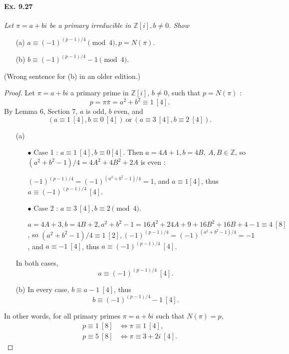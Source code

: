 \documentclass[11pt,a4paper]{article}
\newcommand{\Z}{\mathbb{Z}}
\begin{document}
\paragraph{Ex. 9.27}

{\it Let $\pi = a+bi$ be a primary irreducible in $\Z[i], b\ne 0$. Show
\begin{enumerate}
\item[(a)] $a \equiv (-1)^{(p-1)/4} \pmod 4, p = N(\pi)$.
\item[(b)] $b \equiv (-1)^{(p-1)/4} - 1 \pmod 4$.
\end{enumerate}
(Wrong sentence for (b) in an older edition.)
}

\begin{proof}
Let $\pi=a+bi$ a primary prime in $\mathbb{Z}[i]$, $b\neq 0$, such that $p = N(\pi)$ : 
$$p = \pi \bar{\pi}=a^2+b^2\equiv 1 \ [4].$$
By Lemma 6, Section 7, $a$ is odd, $b$ even, and 
 $$(a\equiv 1\ [4], b\equiv 0 \ [4])\ \mathrm{or}\  (a\equiv 3\  [4], b\equiv 2 \ [4]) .$$
\begin{enumerate}
\item[(a)]
	\begin{enumerate}
	\item[$\bullet$] Case 1 : $a \equiv 1 \ [4], b \equiv 0 [4]$. Then
	$a=4A+1,b=4B,\ A,B \in \Z$, so  $(a^2+b^2-1)/4= 4A^2+4B^2+2A$ is even : 

	$(-1)^{(p-1)/4} = (-1)^{(a^2+b^2-1)/4} = 1$, and $a\equiv 1 [4]$, thus $a \equiv (-1)^{(p-1)/4} \ [4]$.
	\item[$\bullet$] Case 2 : $ a\equiv 3 \ [4], b \equiv 2 \pmod 4$.
	
	$a=4A+3,b=4B+2, a^2+b^2-1 = 16 A^2+24A+9+16B^2+16B+4-1 \equiv 4 \ [8]$, so $(a^2+b^2-1)/4 \equiv 1 \ [2], (-1)^{(p-1)/4} = (-1)^{(a^2+b^2-1)/4} = -1$, and $a \equiv -1\ [4]$, thus  $a \equiv (-1)^{(p-1)/4} \ [4]$.
	\end{enumerate}
	In both cases, 
	$$ a \equiv (-1)^{(p-1)/4} \ [4].$$
\item[(b)] In every case, $b \equiv a-1 \ [4]$, thus
$$ b \equiv (-1)^{(p-1)/4}-1 \ [4].$$

\end{enumerate}
In other words, for all primary primes $\pi = a + bi$ such that $N(\pi) = p$,
\begin{align*}
p \equiv 1\ [8] &\iff \pi  \equiv 1 \ [4],\\
p \equiv 5\ [8] &\iff \pi  \equiv 3 + 2i \ [4].
\end{align*}
\end{proof}
\end{document}
